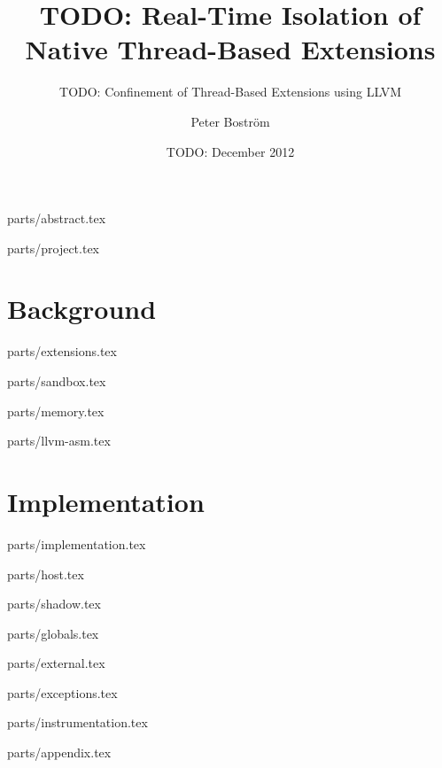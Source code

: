 \documentclass[a4paper,11pt]{xjobb/kth-mag}
\title {TODO: Real-Time Isolation of Native Thread-Based Extensions}
\subtitle {TODO: Confinement of Thread-Based Extensions using LLVM}
\author {Peter Boström}
\date {TODO: December 2012}
\begin{document}
\frontmatter
\pagestyle {empty}
\removepagenumbers
\maketitle
{}

 {parts/abstract.tex}

\clearpage
\tableofcontents*
\mainmatter
\pagestyle {newchap}

 {parts/project.tex}


\part {Background}

 {parts/extensions.tex}

 {parts/sandbox.tex}

 {parts/memory.tex}

 {parts/llvm-asm.tex}


\part {Implementation}

 {parts/implementation.tex}

 {parts/host.tex}

 {parts/shadow.tex}

 {parts/globals.tex}

 {parts/external.tex}

 {parts/exceptions.tex}

 {parts/instrumentation.tex}


\appendix
\addappheadtotoc

 {parts/appendix.tex}
\end{document}
